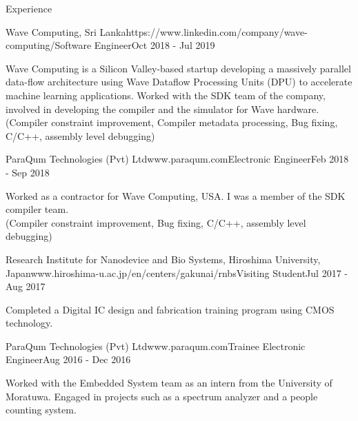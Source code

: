 \documentclass[
	11pt, %
]{./assets/resume} %
\begin{document}
\begin{rSection}{Experience}
    \begin{rSubsectionX}{Wave Computing, Sri Lanka}{https://www.linkedin.com/company/wave-computing/}{Software Engineer}{Oct 2018 - Jul 2019}
        \item Wave Computing is a Silicon Valley-based startup developing a massively parallel data-flow architecture using Wave Dataflow Processing Units (DPU) to accelerate machine learning applications. Worked with the SDK team of the company, involved in developing the compiler and the simulator for Wave hardware.\\
        (Compiler constraint improvement, Compiler metadata processing, Bug fixing, C/C++, assembly level debugging)
    \end{rSubsectionX}

    \begin{rSubsectionX}{ParaQum Technologies (Pvt) Ltd}{www.paraqum.com}{Electronic Engineer}{Feb 2018 - Sep 2018}
        \item Worked as a contractor for Wave Computing, USA. I was a member of the SDK compiler team.\\
        (Compiler constraint improvement, Bug fixing, C/C++, assembly level debugging)
    \end{rSubsectionX}

    \begin{rSubsectionX}{Research Institute for Nanodevice and Bio Systems, Hiroshima University, Japan}{www.hiroshima-u.ac.jp/en/centers/gakunai/rnbs}{Visiting Student}{Jul 2017 - Aug 2017}
        \item Completed a Digital IC design and fabrication training program using CMOS technology.
    \end{rSubsectionX}

    \begin{rSubsectionX}{ParaQum Technologies (Pvt) Ltd}{www.paraqum.com}{Trainee Electronic Engineer}{Aug 2016 - Dec 2016}
        \item Worked with the Embedded System team as an intern from the University of Moratuwa. Engaged in projects such as a spectrum analyzer and a people counting system.
    \end{rSubsectionX}
\end{rSection}

\end{document}
